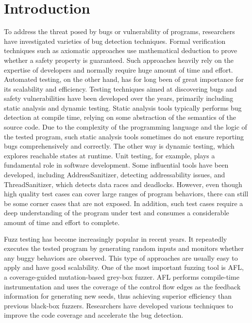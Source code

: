 \chapter{\label{cha:intro}Introduction}


To address the threat posed by bugs or vulnerability of programs, researchers have investigated varieties of bug detection techniques. Formal verification techniques such as axiomatic approaches use mathematical deduction to prove whether a safety property is guaranteed. Such approaches heavily rely on the expertise of developers and normally require huge amount of time and effort\cite{sel4}.
Automated testing, on the other hand, has for long been of great importance for its scalability and efficiency. Testing techniques aimed at discovering bugs and safety vulnerabilities have been developed over the years, primarily including static analysis and dynamic testing. Static analysis tools\cite{infer, RacerD} typically performs bug detection at compile time, relying on some abstraction of the semantics of the source code. 
Due to the complexity of the programming language and the logic of the tested program, such static analysis tools sometimes do not ensure reporting bugs comprehensively and correctly. The other way is dynamic testing, which explores reachable states at runtime. Unit testing, for example, plays a fundamental role in software development. Some influential tools have been developed, including AddressSanitizer\cite{ASAN}, detecting addressability issues, and ThreadSanitizer\cite{TSAN}, which detects data races and deadlocks. However, even though high quality test cases can cover large ranges of program behaviors, there can still be some corner cases that are not exposed. In addition, such test cases require a deep understanding of the program under test and consumes a considerable amount of time and effort to complete. 


Fuzz testing has become increasingly popular in recent years. It repeatedly executes the tested program by generating random inputs and monitors whether any buggy behaviors are observed. This type of approaches are usually easy to apply and have good scalability. One of the most important fuzzing tool is AFL\cite{afl}, a coverage-guided mutation-based grey-box fuzzer. AFL performs compile-time instrumentation and uses the coverage of the control flow edges as the feedback information for generating new seeds, thus achieving superior efficiency than previous black-box fuzzers. Researchers have developed various techniques to improve the code coverage and accelerate the bug detection. 

